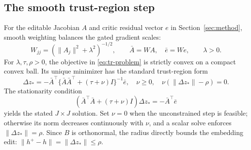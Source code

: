 \documentclass{article}
\theoremstyle{plain}
\theoremstyle{definition}
\begin{document}
\subsection{The smooth trust-region step}
\label{app:solver}
For the editable Jacobian $A$ and critic residual vector $e$ in
Section~\ref{sec:method}, smooth weighting balances the gated gradient scales:
\begin{equation}
 W_{jj}=(\|A_j\|^2+\lambda^2)^{-1/2},\qquad
 \bar A=WA,\quad\bar e=We,\qquad\lambda>0.
 \label{eq:normalization}
\end{equation}
For $\lambda,\tau,\rho>0$, the objective in \eqref{eq:tr-problem} is
strictly convex on a compact convex ball. Its unique minimizer has the
standard trust-region form \citep{more1983}
\begin{equation}
 \Delta z_*=-\bar A^\top\{\bar A\bar A^\top+(\tau+\nu)I\}^{-1}\bar e,
 \quad\nu\ge0,\quad\nu(\|\Delta z_*\|-\rho)=0.
 \label{eq:tr-solution}
\end{equation}
The stationarity condition
\[
 (\bar A^\top\bar A+(\tau+\nu)I)\Delta z_*=-\bar A^\top\bar e
\]
yields the stated $J\times J$ solution. Set $\nu=0$ when the unconstrained
step is feasible; otherwise its norm decreases continuously with $\nu$,
and a scalar solve enforces $\|\Delta z_*\|=\rho$. Since $B$ is orthonormal,
the radius directly bounds the embedding edit:
$\|h^+-h\|=\|\Delta z_*\|\le\rho$.



\end{document}
